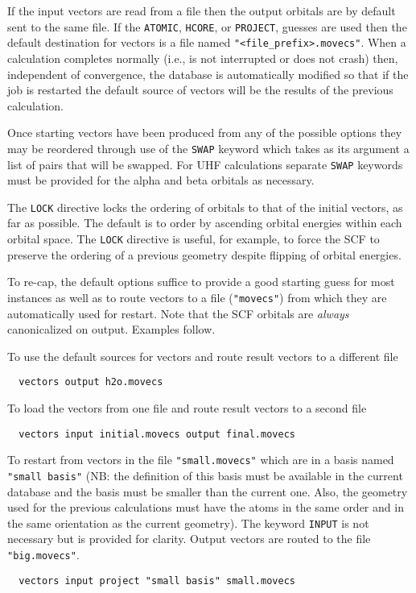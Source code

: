 If the input vectors are read from a file then the output orbitals are
by default sent to the same file.  If the \verb+ATOMIC+, \verb+HCORE+,
or \verb+PROJECT+, guesses are used then the default destination for
vectors is a file named \verb+"<file_prefix>.movecs"+.  When a
calculation completes normally (i.e., is not interrupted or does not
crash) then, independent of convergence, the database is automatically
modified so that if the job is restarted the default source of vectors
will be the results of the previous calculation.

Once starting vectors have been produced from any of the possible
options they may be reordered through use of the \verb+SWAP+ keyword
which takes as its argument a list of pairs that will be swapped.
For UHF calculations separate \verb+SWAP+ keywords must be provided
for the alpha and beta orbitals as necessary.

The \verb+LOCK+ directive locks the ordering of orbitals to that of the
initial vectors, as far as possible. The default is to order by
ascending orbital energies within each orbital space. The \verb+LOCK+
directive is useful, for example, to force the SCF to preserve the
ordering of a previous geometry despite flipping of orbital energies.

To re-cap, the default options suffice to provide a good starting
guess for most instances as well as to route vectors to a file
(\verb+"movecs"+) from which they are automatically used for restart.
Note that the SCF orbitals are {\em always} canonicalized on output.
Examples follow.

To use the default sources for vectors and route result vectors
to a different file
\begin{verbatim}
  vectors output h2o.movecs
\end{verbatim}

To load the vectors from one file and route result vectors to a
second file
\begin{verbatim}
  vectors input initial.movecs output final.movecs
\end{verbatim}

\sloppy

To restart from vectors in the file \verb+"small.movecs"+ which are in
a basis named \verb+"small basis"+ (NB: the definition of this basis
must be available in the current database and the basis must be
smaller than the current one.  Also, the geometry used for the
previous calculations must have the atoms in the same order and in the
same orientation as the current geometry).  The keyword \verb+INPUT+
is not necessary but is provided for clarity.  Output vectors are
routed to the file \verb+"big.movecs"+.
\begin{verbatim}
  vectors input project "small basis" small.movecs
\end{verbatim}

